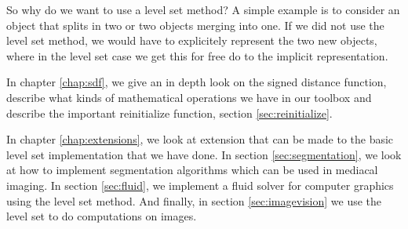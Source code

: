 So why do we want to use a level set method? A simple example is to consider an object that splits in two or two objects merging into one. If we did not use the level set method, we would have to explicitely represent the two new objects, where in the level set case we get this for free do to the implicit representation.



In chapter \ref{chap:sdf}, we give an in depth look on the signed distance function, describe what kinds of mathematical operations we have in our toolbox and describe the important reinitialize function, section \ref{sec:reinitialize}.

In chapter \ref{chap:extensions}, we look at extension that can be made to the basic level set implementation that we have done. In section \ref{sec:segmentation}, we look at how to implement segmentation algorithms which can be used in mediacal imaging. In section \ref{sec:fluid}, we implement a fluid solver for computer graphics using the level set method. And finally, in section \ref{sec:imagevision} we use the level set to do computations on images.





